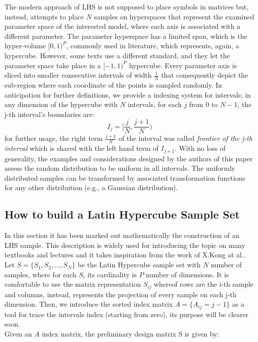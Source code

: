 \documentclass[12pt]{article}
\begin{document}
The modern approach of LHS is not supposed to place symbols in matrices but, instead, attempts to place $N$ samples on hyperspaces that represent the examined parameter space of the interested model, where each axis is associated with a different parameter. The parameter hyperspace has a limited span, which is the hyper-volume $[0,1)^P$, commonly used in literature, which represents, again, a hypercube. However, some texts use a different standard, and they let the parameter space take place in a $[-1,1)^P$ hypercube. Every parameter axis is sliced into smaller consecutive intervals of width $\frac{1}{N}$ that consequently depict the sub-region where each coordinate of the points is sampled randomly. In anticipation for further definitions, we provide a indexing system for intervals; in any dimension of the hypercube with $N$ intervals, for each $j$ from 0 to $N-1$, the j-th interval's boundaries are:
\begin{equation}
\label{eq:interval_index}
I_j = \Big[\frac{j}{N}, \frac{j + 1}{N}\Big)
\end{equation}
for further usage, the right term $\frac{j + 1}{N}$ of the interval was called \textit{frontier of the j-th interval} which is shared with the left hand term of $I_{j+1}$. 
With no loss of generality, the examples and considerations designed by the authors of this paper assess the random distribution to be uniform in all intervals. The uniformly distributed samples can be transformed by associated transformation functions for any other distribution (e.g., a Gaussian distribution).

\subsection{How to build a Latin Hypercube Sample Set}
\label{subsec:how_to_lhs}
In this section it has been marked out mathematically the construction of an LHS sample. This description is widely used for introducing the topic on many textbooks and lectures and it takes inspiration from the work of X.Kong at al..
Let $S = \{S_1, S_2, ..., S_N\}$ be the Latin Hypercube sample set with $N$ number of samples, where for each $S_i$ its cardinality is $P$ number of dimensions. It is comfortable to use the matrix representation $S_{ij}$ whereof rows are the i-th sample and columns, instead, represents the projection of every sample on each j-th dimension. Then, we introduce the sorted index matrix $A = \{A_{ij} = j - 1\}$ as a tool for trace the intervals index (starting from zero), its purpose will be clearer soon. \\
Given an $A$ index matrix, the preliminary design matrix S is given by: 
\end{document}
